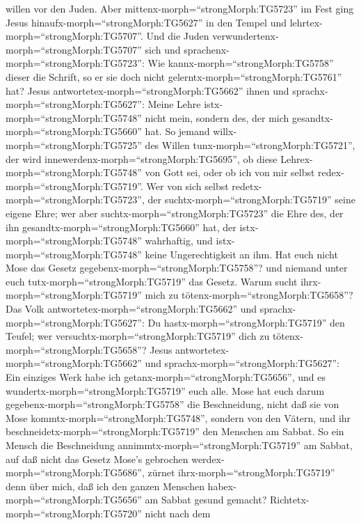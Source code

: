 willen vor den Juden.  Aber
mittenx-morph=``strongMorph:TG5723'' im Fest ging Jesus
hinaufx-morph=``strongMorph:TG5627'' in den Tempel und
lehrtex-morph=``strongMorph:TG5707''.  Und die Juden
verwundertenx-morph=``strongMorph:TG5707'' sich und
sprachenx-morph=``strongMorph:TG5723'': Wie
kannx-morph=``strongMorph:TG5758'' dieser die Schrift, so er sie doch
nicht gelerntx-morph=``strongMorph:TG5761'' hat?  Jesus
antwortetex-morph=``strongMorph:TG5662'' ihnen und
sprachx-morph=``strongMorph:TG5627'': Meine Lehre
istx-morph=``strongMorph:TG5748'' nicht mein, sondern des, der mich
gesandtx-morph=``strongMorph:TG5660'' hat.  So jemand
willx-morph=``strongMorph:TG5725'' des Willen
tunx-morph=``strongMorph:TG5721'', der wird
innewerdenx-morph=``strongMorph:TG5695'', ob diese
Lehrex-morph=``strongMorph:TG5748'' von Gott sei, oder ob ich von mir
selbst redex-morph=``strongMorph:TG5719''.  Wer von sich
selbst redetx-morph=``strongMorph:TG5723'', der
suchtx-morph=``strongMorph:TG5719'' seine eigene Ehre; wer aber
suchtx-morph=``strongMorph:TG5723'' die Ehre des, der ihn
gesandtx-morph=``strongMorph:TG5660'' hat, der
istx-morph=``strongMorph:TG5748'' wahrhaftig, und
istx-morph=``strongMorph:TG5748'' keine Ungerechtigkeit an ihm.
 Hat euch nicht Mose das Gesetz
gegebenx-morph=``strongMorph:TG5758''? und niemand unter euch
tutx-morph=``strongMorph:TG5719'' das Gesetz. Warum sucht
ihrx-morph=``strongMorph:TG5719'' mich zu
tötenx-morph=``strongMorph:TG5658''?  Das Volk
antwortetex-morph=``strongMorph:TG5662'' und
sprachx-morph=``strongMorph:TG5627'': Du
hastx-morph=``strongMorph:TG5719'' den Teufel; wer
versuchtx-morph=``strongMorph:TG5719'' dich zu
tötenx-morph=``strongMorph:TG5658''?  Jesus
antwortetex-morph=``strongMorph:TG5662'' und
sprachx-morph=``strongMorph:TG5627'': Ein einziges Werk habe ich
getanx-morph=``strongMorph:TG5656'', und es
wundertx-morph=``strongMorph:TG5719'' euch alle.  Mose hat
euch darum gegebenx-morph=``strongMorph:TG5758'' die Beschneidung, nicht
daß sie von Mose kommtx-morph=``strongMorph:TG5748'', sondern von den
Vätern, und ihr beschneidetx-morph=``strongMorph:TG5719'' den Menschen
am Sabbat.  So ein Mensch die Beschneidung
annimmtx-morph=``strongMorph:TG5719'' am Sabbat, auf daß nicht das
Gesetz Mose's gebrochen werdex-morph=``strongMorph:TG5686'', zürnet
ihrx-morph=``strongMorph:TG5719'' denn über mich, daß ich den ganzen
Menschen habex-morph=``strongMorph:TG5656'' am Sabbat gesund gemacht?
 Richtetx-morph=``strongMorph:TG5720'' nicht nach dem
